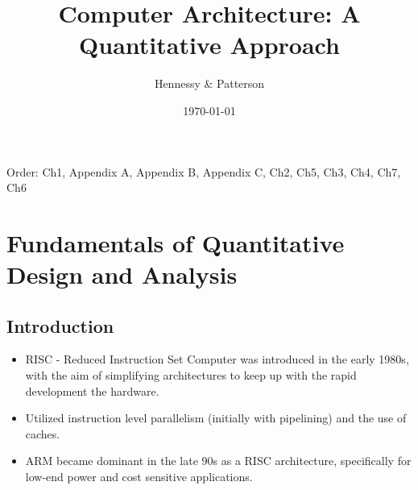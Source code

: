 \documentclass[11pt, a4paper]{article}
\title{Computer Architecture: A Quantitative Approach}
\author{Hennessy \& Patterson}
\date{\today}
\theoremstyle{definition}
\theoremstyle{remark}
\newcommand{\chap}[2]{%
  \renewcommand{\thesection}{\arabic{section}}%
  \renewcommand{\theHsection}{chap.\arabic{section}}%
  \setcounter{section}{#1}\addtocounter{section}{-1}%
  \section{#2}}
\begin{document}
\maketitle
\tableofcontents          %
Order: Ch1, Appendix A, Appendix B, Appendix C, Ch2, Ch5, Ch3, Ch4, Ch7, Ch6
\newpage
\chap{1}{Fundamentals of Quantitative Design and Analysis}
\subsection{Introduction}
\begin{itemize}
    \item RISC - Reduced Instruction Set Computer was introduced in the early 1980s, with the aim of simplifying architectures to keep up with the rapid development the hardware.
    \item Utilized instruction level parallelism (initially with pipelining) and the use of caches.
    \item ARM became dominant in the late 90s as a RISC architecture, specifically for low-end power and cost sensitive applications.
\end{itemize}
\end{document}
